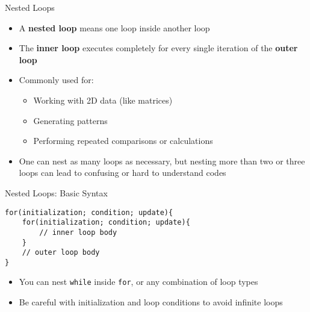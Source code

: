 \documentclass[12pt, aspectratio=169]{beamer}
\begin{document}
    \begin{frame}{Nested Loops}
        \begin{itemize}
            \item A \textbf{nested loop} means one loop inside another loop
            \item The \textbf{inner loop} executes completely for every single iteration of the \textbf{outer loop}
            \item Commonly used for:
            \begin{itemize}
                \item Working with 2D data (like matrices)
                \item Generating patterns
                \item Performing repeated comparisons or calculations
            \end{itemize}
            \item One can nest as many loops as necessary, but nesting more than two or three loops can lead to confusing or hard to understand codes
        \end{itemize}
    \end{frame}


    \begin{frame}[fragile]{Nested Loops: Basic Syntax}
        \begin{verbatim}
for(initialization; condition; update){
    for(initialization; condition; update){
        // inner loop body
    }
    // outer loop body
}
        \end{verbatim}

        \begin{itemize}
            \item You can nest \texttt{while} inside \texttt{for}, or any combination of loop types
            \item Be careful with initialization and loop conditions to avoid infinite loops
        \end{itemize}
    \end{frame}




\end{document}
